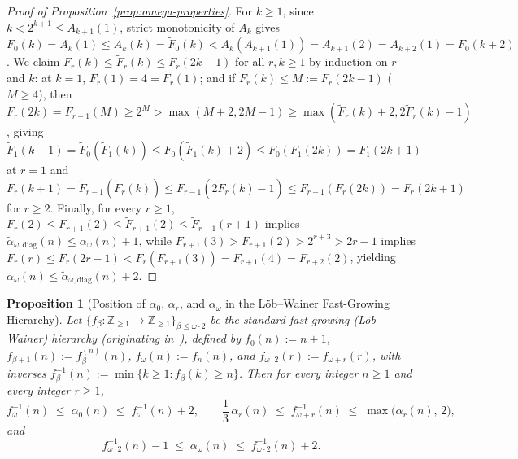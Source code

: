\documentclass[11pt]{article}
\newtheorem{proposition}[theorem]{Proposition}
\theoremstyle{definition}
\theoremstyle{remark}
\begin{document}
\begin{proof}[Proof of Proposition~\ref{prop:omega-properties}]
For $k \ge 1$, since $k < 2^{k+1} \le A_{k+1}(1)$, strict monotonicity of $A_k$ gives $F_0(k) = A_k(1) \le A_k(k) = \widetilde{F}_0(k) < A_k(A_{k+1}(1)) = A_{k+1}(2) = A_{k+2}(1) = F_0(k + 2)$. We claim $F_r(k) \le \widetilde{F}_r(k) \le F_r(2k - 1)$ for all $r, k \ge 1$ by induction on $r$ and $k$: at $k = 1$, $F_r(1) = 4 = \widetilde{F}_r(1)$; and if $\widetilde{F}_r(k) \le M := F_r(2k - 1)$ ($M \ge 4$), then $F_r(2k) = F_{r-1}(M) \ge 2^M > \max(M + 2, 2M - 1) \ge \max(\widetilde{F}_r(k) + 2, 2\widetilde{F}_r(k) - 1)$, giving $\widetilde{F}_1(k + 1) = \widetilde{F}_0(\widetilde{F}_1(k)) \le F_0(\widetilde{F}_1(k) + 2) \le F_0(F_1(2k)) = F_1(2k + 1)$ at $r = 1$ and $\widetilde{F}_r(k + 1) = \widetilde{F}_{r-1}(\widetilde{F}_r(k)) \le F_{r-1}(2\widetilde{F}_r(k) - 1) \le F_{r-1}(F_r(2k)) = F_r(2k + 1)$ for $r \ge 2$. Finally, for every $r \ge 1$, $F_r(2) \le F_{r+1}(2) \le \widetilde{F}_{r+1}(2) \le \widetilde{F}_{r+1}(r + 1)$ implies $\widetilde{\alpha}_{\omega,\mathrm{diag}}(n) \le \alpha_\omega(n) + 1$, while $F_{r+1}(3) > F_{r+1}(2) > 2^{r+3} > 2r - 1$ implies $\widetilde{F}_r(r) \le F_r(2r - 1) < F_r(F_{r+1}(3)) = F_{r+1}(4) = F_{r+2}(2)$, yielding $\alpha_\omega(n) \le \widetilde{\alpha}_{\omega,\mathrm{diag}}(n) + 2$.
\end{proof}

\begin{proposition}[Position of $\alpha_0$, $\alpha_r$, and $\alpha_\omega$ in the L\"{o}b--Wainer Fast-Growing Hierarchy]
\label{prop:lob-wainer}
Let $\{f_\beta : \mathbb{Z}_{\ge 1} \to \mathbb{Z}_{\ge 1}\}_{\beta \le \omega \cdot 2}$ be the standard fast-growing (L\"{o}b--Wainer) hierarchy (originating in~\cite{LobWainer1970I,LobWainer1970II}), defined by $f_0(n) := n + 1$, $f_{\beta+1}(n) := f_\beta^{(n)}(n)$, $f_\omega(n) := f_n(n)$, and $f_{\omega \cdot 2}(r) := f_{\omega + r}(r)$, with inverses $f_\beta^{-1}(n) := \min\{k \ge 1 : f_\beta(k) \ge n\}$. Then for every integer $n \ge 1$ and every integer $r \ge 1$,
\[
f_\omega^{-1}(n) \;\le\; \alpha_0(n) \;\le\; f_\omega^{-1}(n) + 2,
\qquad
\frac{1}{3}\,\alpha_r(n) \;\le\; f_{\omega + r}^{-1}(n) \;\le\; \max\big(\alpha_r(n),\, 2\big),
\]
and
\[
f_{\omega \cdot 2}^{-1}(n) - 1 \;\le\; \alpha_\omega(n) \;\le\; f_{\omega \cdot 2}^{-1}(n) + 2.
\]
\end{proposition}
\end{document}
